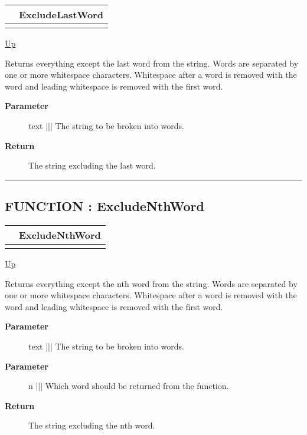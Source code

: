 {\renewcommand{\arraystretch}{1.5}
\begin{tabularx}{\textwidth}{|>{\raggedright\arraybackslash}l|X|}
\hline
\hspace{0pt} & ExcludeLastWord \\
\hline
\multicolumn{2}{|>{\raggedright\arraybackslash}X|}{\hspace{0pt}(STRING text)} \\
\hline
\end{tabularx}
}

\hyperlink{ecldoc:Str}{Up}

\par
Returns everything except the last word from the string. Words are separated by one or more whitespace characters. Whitespace after a word is removed with the word and leading whitespace is removed with the first word.

\par
\begin{description}
\item [\textbf{Parameter}] text ||| The string to be broken into words.
\item [\textbf{Return}] The string excluding the last word.
\end{description}

\rule{\textwidth}{0.4pt}
\subsection*{FUNCTION : ExcludeNthWord}
\hypertarget{ecldoc:str.excludenthword}{}

{\renewcommand{\arraystretch}{1.5}
\begin{tabularx}{\textwidth}{|>{\raggedright\arraybackslash}l|X|}
\hline
\hspace{0pt} & ExcludeNthWord \\
\hline
\multicolumn{2}{|>{\raggedright\arraybackslash}X|}{\hspace{0pt}(STRING text, UNSIGNED2 n)} \\
\hline
\end{tabularx}
}

\hyperlink{ecldoc:Str}{Up}

\par
Returns everything except the nth word from the string. Words are separated by one or more whitespace characters. Whitespace after a word is removed with the word and leading whitespace is removed with the first word.

\par
\begin{description}
\item [\textbf{Parameter}] text ||| The string to be broken into words.
\item [\textbf{Parameter}] n ||| Which word should be returned from the function.
\item [\textbf{Return}] The string excluding the nth word.
\end{description}

